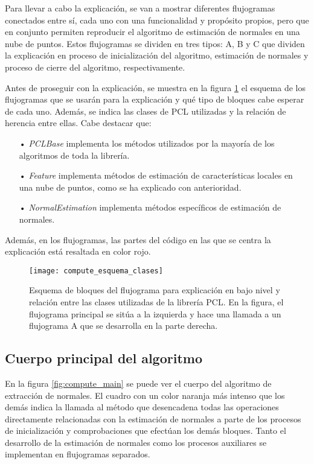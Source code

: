 Para llevar a cabo la explicación, se van a mostrar diferentes flujogramas conectados entre sí, cada uno con una funcionalidad y propósito propios, pero que en conjunto permiten reproducir el algoritmo de estimación de normales en una nube de puntos. Estos flujogramas se dividen en tres tipos: A, B y C que dividen la explicación en proceso de inicialización del algoritmo, estimación de normales y proceso de cierre del algoritmo, respectivamente.

Antes de proseguir con la explicación, se muestra en la figura \ref{fig:compute_esquema_clases} el esquema de los flujogramas que se usarán para la explicación y qué tipo de bloques cabe esperar de cada uno. Además, se indica las clases de PCL utilizadas y la relación de herencia entre ellas. Cabe destacar que:

\begin{itemize}
\item[•]\textit{PCLBase} implementa los métodos utilizados por la mayoría de los algoritmos de toda la librería.
\item[•]\textit{Feature} implementa métodos de estimación de características locales en una nube de puntos, como se ha explicado con anterioridad.
\item[•]\textit{NormalEstimation} implementa métodos específicos de estimación de normales.
\end{itemize} 

Además, en los flujogramas, las partes del código en las que se centra la explicación está resaltada en color rojo.

\begin{figure}[h!]
\centering
\texttt{[image: compute\_esquema\_clases]}
\caption{Esquema de bloques del flujograma para explicación en bajo nivel y relación entre las clases utilizadas de la librería PCL. En la figura, el flujograma principal se sitúa a la izquierda y hace una llamada a un flujograma A que se desarrolla en la parte derecha.}\label{fig:compute_esquema_clases}
\end{figure}

\subsection{Cuerpo principal del algoritmo}
En la figura \ref{fig:compute_main} se puede ver el cuerpo del algoritmo de extracción de normales. El cuadro con un color naranja más intenso que los demás indica la llamada al método que desencadena todas las operaciones directamente relacionadas con la estimación de normales a parte de los procesos de inicialización y comprobaciones que efectúan los demás bloques. Tanto el desarrollo de la estimación de normales como los procesos auxiliares se implementan en flujogramas separados.

